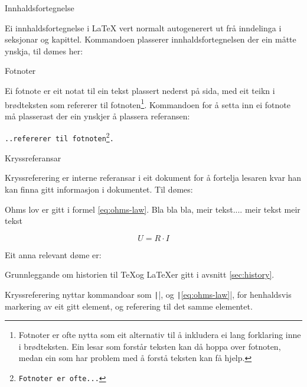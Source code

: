 	\begin{frame}{Innhaldsfortegnelse}
	
	Ei innhaldsfortegnelse i \LaTeX{} vert normalt autogenerert ut frå inndelinga i seksjonar og kapittel. Kommandoen \texttt{\tableofcontents} plasserer innhaldsfortegnelsen der ein måtte ynskja, til dømes her:\\
	
	\tableofcontents
\end{frame}

\begin{frame}{Fotnoter}
	
	Ei fotnote er eit notat til ein tekst plassert nederst på sida, med eit teikn i brødteksten som refererer til fotnoten\footnote{Fotnoter er ofte nytta som eit alternativ til å inkludera ei lang forklaring inne i brødteksten. Ein lesar som forstår teksten kan då hoppa over fotnoten, medan ein som har problem med å forstå teksten kan få hjelp.}. Kommandoen for å setta inn ei fotnote må plasserast der ein ynskjer å plassera referansen:
	
	\texttt{..refererer til fotnoten\footnote{Fotnoter er ofte...}.}
	
\end{frame}

\begin{frame}{Kryssreferansar}
	
	Kryssreferering er interne referansar i eit dokument for å fortelja lesaren kvar han kan finna gitt informasjon i dokumentet. Til dømes:
	
	\begin{displayquote}
		Ohms lov er gitt i formel \eqref{eq:ohms-law}. Bla bla bla, meir tekst.... meir tekst meir tekst
		
		\begin{equation}
			U = R \cdot I
			\label{eq:ohms-law}
		\end{equation}
		
	\end{displayquote}
	
	Eit anna relevant døme er:
	
	\begin{displayquote}
		Grunnleggande om historien til \TeX og \LaTeX er gitt i avsnitt \ref{sec:history}.
	\end{displayquote}
	
	Kryssreferering nyttar kommandoar som \texttt|\label{eq:ohms-law}|, og \texttt|\eqref{eq:ohms-law}|, for henhaldsvis markering av eit gitt element, og referering til det samme elementet.

	
\end{frame}








